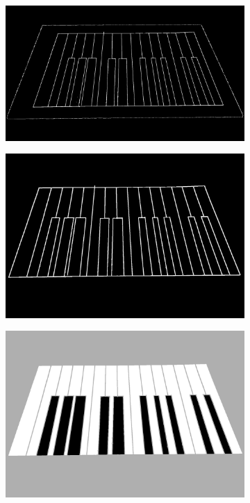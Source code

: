 \begin{figure}[ht]
\begin{subfigure}{0.49\textwidth}
		\caption{}
		\label{fig:canny}
	\end{subfigure}
	\hfill
	\begin{subfigure}{0.49\textwidth}
		\centering
		\includegraphics[width=\textwidth]{images/application/45deg/canny-closed}
		\caption{}
		\label{fig:canny-closed}
	\end{subfigure}
	\hfill
	\begin{subfigure}{0.49\textwidth}
		\centering
		\includegraphics[width=\textwidth]{images/application/45deg/contours}
		\caption{}
		\label{fig:contours}
	\end{subfigure}
	\hfill
	\begin{subfigure}{0.49\textwidth}
		\centering
		\includegraphics[width=\textwidth]{images/application/45deg/tiles-overlay}

\end{subfigure}
\end{figure}

